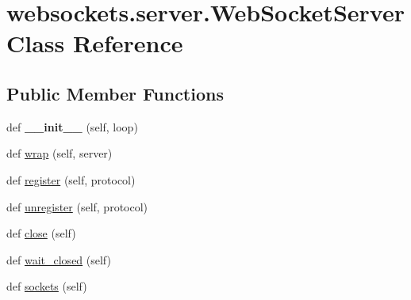 \hypertarget{classwebsockets_1_1server_1_1_web_socket_server}{}\section{websockets.\+server.\+Web\+Socket\+Server Class Reference}
\label{classwebsockets_1_1server_1_1_web_socket_server}
\subsection*{Public Member Functions}
\begin{DoxyCompactItemize}
\item 
\mbox{\label{classwebsockets_1_1server_1_1_web_socket_server_a0654e289d8c9887f0ed3e57c04efdf06}} 
def {\bfseries \+\_\+\+\_\+init\+\_\+\+\_\+} (self, loop)
\item 
def \hyperlink{classwebsockets_1_1server_1_1_web_socket_server_a60597fd69a0934641d155224dabbbbb6}{wrap} (self, server)
\item 
def \hyperlink{classwebsockets_1_1server_1_1_web_socket_server_aeb56f1f2ae987bc26a411df007ebbad2}{register} (self, protocol)
\item 
def \hyperlink{classwebsockets_1_1server_1_1_web_socket_server_aa31d87887a41677810ee3bf697c91c6b}{unregister} (self, protocol)
\item 
def \hyperlink{classwebsockets_1_1server_1_1_web_socket_server_a8c35ed402352e7ba84f5f63759416634}{close} (self)
\item 
def \hyperlink{classwebsockets_1_1server_1_1_web_socket_server_a26e9d65297da6b0cbd03bdffb59da006}{wait\+\_\+closed} (self)
\item 
def \hyperlink{classwebsockets_1_1server_1_1_web_socket_server_af29b25dfd0978574df573130b4f0c3e3}{sockets} (self)
\end{DoxyCompactItemize}
